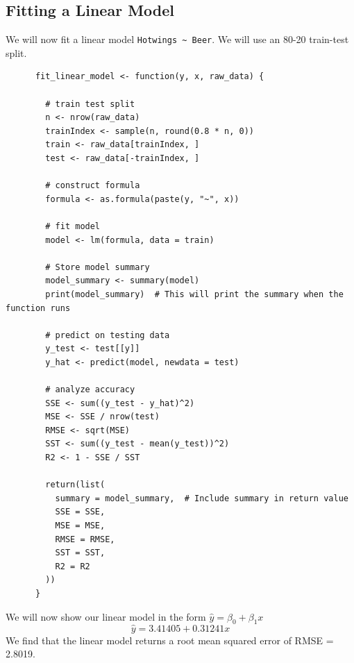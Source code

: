 \documentclass{article}
\theoremstyle{mytheoremstyle}
\theoremstyle{mytheoremstyle}
\theoremstyle{myproblemstyle}
\begin{document}
      \subsection{Fitting a Linear Model}
      We will now fit a linear model \verb|Hotwings ~ Beer|. We will use an 80-20 train-test split. 
      \vspace{0.1in} 
      \begin{lstlisting}
      fit_linear_model <- function(y, x, raw_data) {

        # train test split
        n <- nrow(raw_data)
        trainIndex <- sample(n, round(0.8 * n, 0))
        train <- raw_data[trainIndex, ]
        test <- raw_data[-trainIndex, ]
  
        # construct formula
        formula <- as.formula(paste(y, "~", x))
  
        # fit model
        model <- lm(formula, data = train)

        # Store model summary
        model_summary <- summary(model)
        print(model_summary)  # This will print the summary when the function runs
  
        # predict on testing data
        y_test <- test[[y]]
        y_hat <- predict(model, newdata = test)
  
        # analyze accuracy
        SSE <- sum((y_test - y_hat)^2)
        MSE <- SSE / nrow(test)  
        RMSE <- sqrt(MSE)
        SST <- sum((y_test - mean(y_test))^2)
        R2 <- 1 - SSE / SST
  
        return(list(
          summary = model_summary,  # Include summary in return value
          SSE = SSE, 
          MSE = MSE, 
          RMSE = RMSE, 
          SST = SST, 
          R2 = R2
        ))
      }
      \end{lstlisting}
      \vspace{0.1in}
      We will now show our linear model in the form \(\hat{y} = \beta_0 + \beta_1 x\)
      \[
        \hat{y} = 3.41405 + 0.31241x
      \]
      We find that the linear model returns a root mean squared error of RMSE = 2.8019. 
      \vspace{0.25in}
\end{document}
